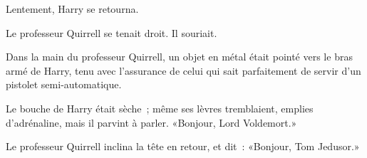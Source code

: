 Lentement, Harry se retourna.

Le professeur Quirrell se tenait droit. Il souriait.

Dans la main du professeur Quirrell, un objet en métal était pointé vers le bras armé de Harry, tenu avec l'assurance de celui qui sait parfaitement de servir d'un pistolet semi-automatique.

Le bouche de Harry était sèche~; même ses lèvres tremblaient, emplies d'adrénaline, mais il parvint à parler. «Bonjour, Lord Voldemort.»

Le professeur Quirrell inclina la tête en retour, et dit~: «Bonjour, Tom Jedusor.» 

